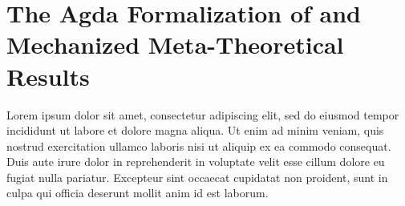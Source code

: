 \chapter{The Agda Formalization of \Surface and Mechanized Meta-Theoretical Results}
\label{ch:mech-metatheory}



Lorem ipsum dolor sit amet, consectetur adipiscing elit, sed do eiusmod tempor incididunt ut labore et dolore magna aliqua. Ut enim ad minim veniam, quis nostrud exercitation ullamco laboris nisi ut aliquip ex ea commodo consequat. Duis aute irure dolor in reprehenderit in voluptate velit esse cillum dolore eu fugiat nulla pariatur. Excepteur sint occaecat cupidatat non proident, sunt in culpa qui officia deserunt mollit anim id est laborum.
